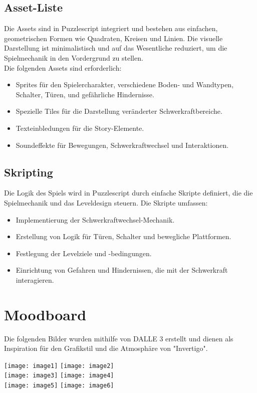 \documentclass{article}
\begin{document}
\subsection{Asset-Liste}
Die Assets sind in Puzzlescript integriert und bestehen aus einfachen, geometrischen Formen wie Quadraten, Kreisen und Linien.
Die visuelle Darstellung ist minimalistisch und auf das Wesentliche reduziert, um die Spielmechanik in den Vordergrund zu stellen.
\\
Die folgenden Assets sind erforderlich:
\begin{itemize}
    \item Sprites für den Spielercharakter, verschiedene Boden- und Wandtypen, Schalter, Türen, und gefährliche Hindernisse.
    \item Spezielle Tiles für die Darstellung veränderter Schwerkraftbereiche.
    \item Texteinbledungen für die Story-Elemente.
    \item Soundeffekte für Bewegungen, Schwerkraftwechsel und Interaktionen.
\end{itemize}

\subsection{Skripting}

Die Logik des Spiels wird in Puzzlescript durch einfache Skripte definiert, die die Spielmechanik und das Leveldesign steuern.
Die Skripte umfassen:
\begin{itemize}
    \item Implementierung der Schwerkraftwechsel-Mechanik.
    \item Erstellung von Logik für Türen, Schalter und bewegliche Plattformen.
    \item Festlegung der Levelziele und -bedingungen.
    \item Einrichtung von Gefahren und Hindernissen, die mit der Schwerkraft interagieren.
\end{itemize}

\section{Moodboard}

Die folgenden Bilder wurden mithilfe von DALLE 3 erstellt und dienen als Inspiration für den Grafikstil und die Atmosphäre von "Invertigo".

\texttt{[image: image1]}
\texttt{[image: image2]}
\\
\texttt{[image: image3]}
\texttt{[image: image4]}
\\
\texttt{[image: image5]}
\texttt{[image: image6]}
\end{document}
